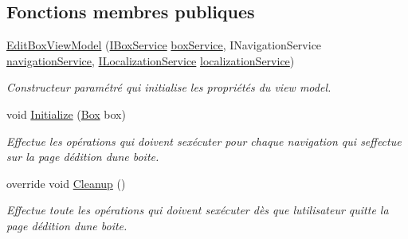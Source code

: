 \subsection*{Fonctions membres publiques}
\begin{DoxyCompactItemize}
\item 
\hyperlink{class_boxes_1_1_view_models_1_1_edit_box_view_model_a3e676dec2417a9f9c0eb9d8b8bfdc6cc}{Edit\+Box\+View\+Model} (\hyperlink{interface_boxes_1_1_services_1_1_box_1_1_i_box_service}{I\+Box\+Service} \hyperlink{class_boxes_1_1_view_models_1_1_edit_box_view_model_a35bb4b67f667937380b5beed177b6ae8}{box\+Service}, I\+Navigation\+Service \hyperlink{class_boxes_1_1_view_models_1_1_edit_box_view_model_a5af96228bc2a2bebdd4372862829c46d}{navigation\+Service}, \hyperlink{interface_boxes_1_1_services_1_1_localization_1_1_i_localization_service}{I\+Localization\+Service} \hyperlink{class_boxes_1_1_view_models_1_1_edit_box_view_model_afe7557739bc131aa155ccd6812df37c4}{localization\+Service})
\begin{DoxyCompactList}\small\item\em Constructeur paramétré qui initialise les propriétés du view model. \end{DoxyCompactList}\item 
void \hyperlink{class_boxes_1_1_view_models_1_1_edit_box_view_model_a55bd2fdf17df409ac8125f5cb5853056}{Initialize} (\hyperlink{class_boxes_1_1_models_1_1_box}{Box} box)
\begin{DoxyCompactList}\small\item\em Effectue les opérations qui doivent s\textquotesingle{}exécuter pour chaque navigation qui s\textquotesingle{}effectue sur la page d\textquotesingle{}édition d\textquotesingle{}une boite. \end{DoxyCompactList}\item 
override void \hyperlink{class_boxes_1_1_view_models_1_1_edit_box_view_model_a9edff57d0ca2a5565af61d0ed68cfb08}{Cleanup} ()
\begin{DoxyCompactList}\small\item\em Effectue toute les opérations qui doivent s\textquotesingle{}exécuter dès que l\textquotesingle{}utilisateur quitte la page d\textquotesingle{}édition d\textquotesingle{}une boite. \end{DoxyCompactList}\end{DoxyCompactItemize}
